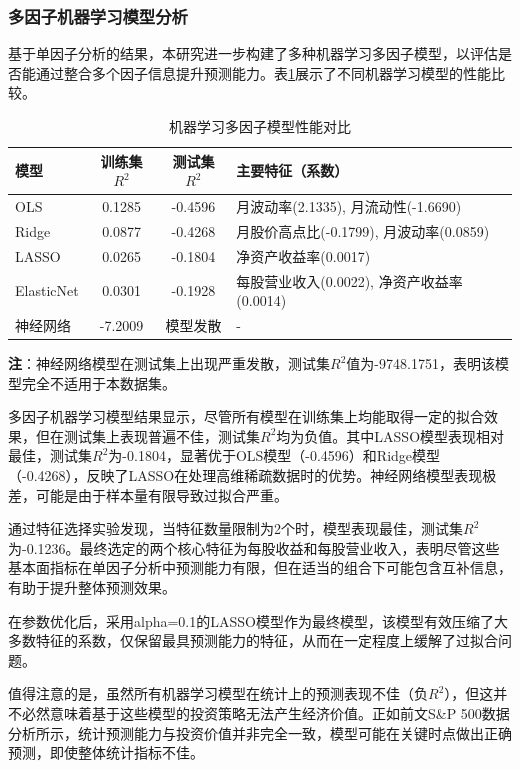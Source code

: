 \documentclass[12pt, a4paper]{article}
\begin{document}
\subsubsection{多因子机器学习模型分析}

基于单因子分析的结果，本研究进一步构建了多种机器学习多因子模型，以评估是否能通过整合多个因子信息提升预测能力。表\ref{tab:ml_models}展示了不同机器学习模型的性能比较。

\begin{table}[htbp]
\centering
\caption{机器学习多因子模型性能对比}
\label{tab:ml_models}
\begin{tabular}{lccl}
\toprule
模型 & 训练集$R^2$ & 测试集$R^2$ & 主要特征（系数） \\
\midrule
OLS & 0.1285 & -0.4596 & 月波动率(2.1335), 月流动性(-1.6690) \\
Ridge & 0.0877 & -0.4268 & 月股价高点比(-0.1799), 月波动率(0.0859) \\
LASSO & 0.0265 & -0.1804 & 净资产收益率(0.0017) \\
ElasticNet & 0.0301 & -0.1928 & 每股营业收入(0.0022), 净资产收益率(0.0014) \\
神经网络 & -7.2009 & 模型发散 & - \\
\bottomrule
\end{tabular}
\end{table}

\noindent \textbf{注}：神经网络模型在测试集上出现严重发散，测试集$R^2$值为-9748.1751，表明该模型完全不适用于本数据集。

多因子机器学习模型结果显示，尽管所有模型在训练集上均能取得一定的拟合效果，但在测试集上表现普遍不佳，测试集$R^2$均为负值。其中LASSO模型表现相对最佳，测试集$R^2$为-0.1804，显著优于OLS模型（-0.4596）和Ridge模型（-0.4268），反映了LASSO在处理高维稀疏数据时的优势。神经网络模型表现极差，可能是由于样本量有限导致过拟合严重。

通过特征选择实验发现，当特征数量限制为2个时，模型表现最佳，测试集$R^2$为-0.1236。最终选定的两个核心特征为每股收益和每股营业收入，表明尽管这些基本面指标在单因子分析中预测能力有限，但在适当的组合下可能包含互补信息，有助于提升整体预测效果。

在参数优化后，采用alpha=0.1的LASSO模型作为最终模型，该模型有效压缩了大多数特征的系数，仅保留最具预测能力的特征，从而在一定程度上缓解了过拟合问题。

值得注意的是，虽然所有机器学习模型在统计上的预测表现不佳（负$R^2$），但这并不必然意味着基于这些模型的投资策略无法产生经济价值。正如前文S\&P 500数据分析所示，统计预测能力与投资价值并非完全一致，模型可能在关键时点做出正确预测，即使整体统计指标不佳。
\end{document}
